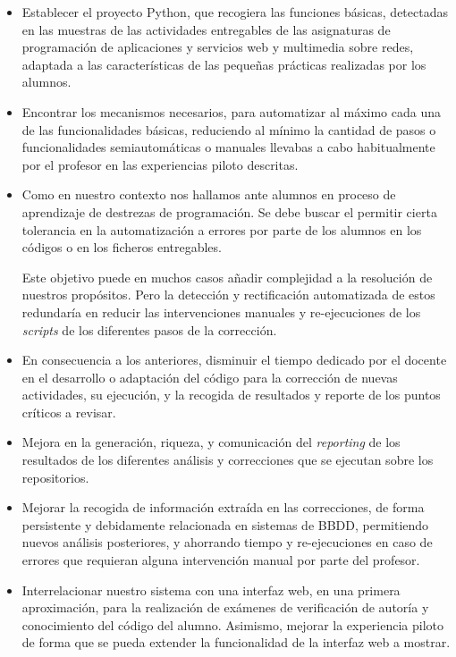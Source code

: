 \begin{itemize}
\item Establecer el proyecto Python, que recogiera las funciones básicas, detectadas en las muestras de las actividades entregables de las asignaturas de programación de aplicaciones y servicios web y multimedia sobre redes, adaptada a las características de las pequeñas prácticas realizadas por los alumnos.

\item Encontrar los mecanismos necesarios, para automatizar al máximo cada una de las funcionalidades básicas, reduciendo al mínimo la cantidad de pasos o funcionalidades semiautomáticas o manuales llevabas a cabo habitualmente por el profesor en las experiencias piloto descritas.

\item Como en nuestro contexto nos hallamos ante alumnos en proceso de aprendizaje de destrezas de programación. Se debe buscar el permitir cierta tolerancia en la automatización a errores por parte de los alumnos en los códigos o en los ficheros entregables.


Este objetivo puede en muchos casos añadir complejidad a la resolución de nuestros propósitos. Pero la detección y rectificación automatizada de estos redundaría en reducir las intervenciones manuales y re-ejecuciones de los \textit{scripts} de los diferentes pasos de la corrección.

\item En consecuencia a los anteriores, disminuir el tiempo dedicado por el docente en el desarrollo o adaptación del código para la corrección de nuevas actividades, su ejecución, y la recogida de resultados y reporte de los puntos críticos a revisar.

\item Mejora en la generación, riqueza, y comunicación del \textit{reporting} de los resultados de los diferentes análisis y correcciones que se ejecutan sobre los repositorios.

\item Mejorar la recogida de información extraída en las correcciones, de forma persistente y debidamente relacionada en sistemas de BBDD, permitiendo nuevos análisis posteriores, y ahorrando tiempo y re-ejecuciones en caso de errores que requieran alguna intervención manual por parte del profesor.

\item Interrelacionar nuestro sistema con una interfaz web, en una primera aproximación, para la realización de exámenes de verificación de autoría y conocimiento del código del alumno. Asimismo, mejorar la experiencia piloto de forma que se pueda extender la funcionalidad de la interfaz web a mostrar.


\end{itemize}
